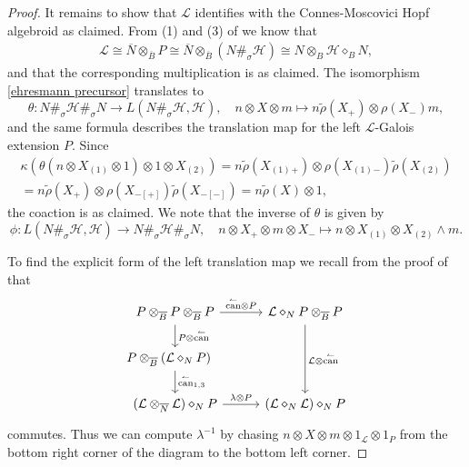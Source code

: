 \documentclass[a4paper,reqno]{amsart}
\numberwithin{equation}{section}
\theoremstyle{plain}
\theoremstyle{remark}
\numberwithin{equation}{section}
\newcommand\inv{^{-1}}
\newcommand{\ot}{\otimes}
\newcommand\ol{\overline}
\newcommand{\cL}{\mathcal{L}}
\newcommand{\BB}{\overline{B}}
\newcommand{\lcan}{\overset\leftharpoonup\can}
\newcommand{\trho}{{\tilde{\rho}}}
\renewcommand{\o}{{}_{\scriptscriptstyle{(1)}}}
\renewcommand{\t}{{}_{\scriptscriptstyle{(2)}}}
\newcommand\ou[1]{\otimes_{#1}}
\newcommand{\CH}{\mathcal{H}}
\newcommand{\CL}{\mathcal{L}}
\newcommand{\can}{{\rm can}}
\begin{document}
\begin{proof}
   It remains to show that $\CL$ identifies with the Connes-Moscovici Hopf algebroid as claimed. From (1) and (3) of   we know that 
   \begin{align*}
       \CL\cong \ol N\ou{\ol B}P\cong \ol N\ou{\ol B}(N\#_\sigma\CH)\cong N\ot_{B} \CH\diamond_{B} N,
   \end{align*}
   and that the corresponding multiplication is as claimed. The isomorphism \eqref{ehresmann precursor} translates to 
    \[\theta:N\#_{\sigma}\CH\#_{\sigma}N\to L(N\#_{\sigma}\CH,\CH),\quad n\ot X\ot m\mapsto n\trho(X_{+})\ot\rho(X_{-})m,\]
    and the same formula describes the translation map for the left $\CL$-Galois extension $P$.
    Since \begin{multline*}\kappa(\theta(n\ot X\o\ot 1)\ot 1\ot X\t)=n\trho(X\o{}_{+})\ot\rho(X\o{}_{-})\trho(X\t)
    \\=n\trho(X_+)\ot\rho(X_{-[+]})\trho(X_{-[-]})=n\trho(X)\ot 1,\end{multline*}
    the coaction is as claimed.
   We note that the inverse of $\theta$ is given by
    \[\phi:L(N\#_{\sigma}\CH,\CH)\to N\#_{\sigma}\CH\#_{\sigma}N,\quad n\ot X_{+}\ot m\ot X_{-}\mapsto n\ot X\o\ot X\t\wedge m.\]



   To find the explicit form of the left translation map we recall from the proof of \cite[Lem.~3.21]{HS25} that 
        \[
\begin{tikzcd}
  &P\ot_{\BB} P\ot_{\BB}P \arrow[d, "P\ot \lcan"] \arrow[r, "\lcan\ot P"] & \cL\diamond_N P \ot_{\BB}P \arrow[dd, "\cL\ot \lcan"] &\\
  &P\ot_{\BB} (\cL \diamond_N P) \arrow[d, " \lcan_{1,3}"]\quad&\qquad&\\
   & (\cL\ot_{\ol N} \cL )\diamond_NP   \arrow[r, "\lambda\ot P"] & (\cL\diamond_N \cL) \diamond_NP &
\end{tikzcd}
\]
commutes. Thus we can compute $\lambda\inv$ by chasing $n\ot X\ot m\ot 1_\CL\ot 1_P$ from the bottom right corner of the diagram to the bottom left corner. 


\end{proof}
\end{document}
